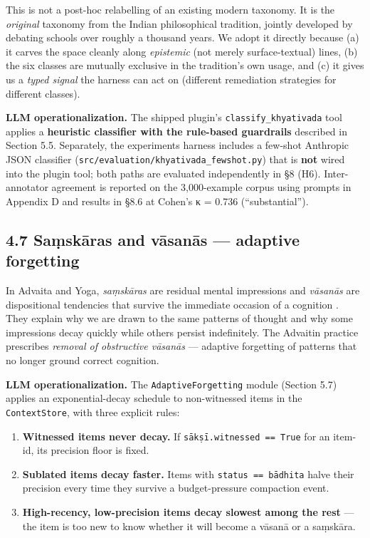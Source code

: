 This is not a post-hoc relabelling of an existing modern taxonomy. It is the \emph{original} taxonomy from the Indian philosophical tradition, jointly developed by debating schools over roughly a thousand years. We adopt it directly because (a) it carves the space cleanly along \emph{epistemic} (not merely surface-textual) lines, (b) the six classes are mutually exclusive in the tradition's own usage, and (c) it gives us a \emph{typed signal} the harness can act on (different remediation strategies for different classes).

\textbf{LLM operationalization.} The shipped plugin's \texttt{classify\_khyativada} tool applies a \textbf{heuristic classifier with the rule-based guardrails} described in Section 5.5. Separately, the experiments harness includes a few-shot Anthropic JSON classifier (\texttt{src/evaluation/khyativada\_fewshot.py}) that is \textbf{not} wired into the plugin tool; both paths are evaluated independently in §8 (H6). Inter-annotator agreement is reported on the 3,000-example corpus using prompts in Appendix D and results in §8.6 at Cohen's κ = 0.736 (``substantial'').

\subsection{4.7 Saṃskāras and vāsanās --- adaptive forgetting}\label{saux1e43skux101ras-and-vux101sanux101s-adaptive-forgetting}

In Advaita and Yoga, \emph{saṃskāras} are residual mental impressions and \emph{vāsanās} are dispositional tendencies that survive the immediate occasion of a cognition \citep{deutsch1969advaita, sankaraupadesha, halbfass1991traditioncomparison}. They explain why we are drawn to the same patterns of thought and why some impressions decay quickly while others persist indefinitely. The Advaitin practice prescribes \emph{removal of obstructive vāsanās} --- adaptive forgetting of patterns that no longer ground correct cognition.

\textbf{LLM operationalization.} The \texttt{AdaptiveForgetting} module (Section 5.7) applies an exponential-decay schedule to non-witnessed items in the \texttt{ContextStore}, with three explicit rules:

\begin{enumerate}
\def\labelenumi{\arabic{enumi}.}
\tightlist
\item
  \textbf{Witnessed items never decay.} If \texttt{sākṣī.witnessed\ ==\ True} for an item-id, its precision floor is fixed.
\item
  \textbf{Sublated items decay faster.} Items with \texttt{status\ ==\ bādhita} halve their precision every time they survive a budget-pressure compaction event.
\item
  \textbf{High-recency, low-precision items decay slowest among the rest} --- the item is too new to know whether it will become a vāsanā or a saṃskāra.
\end{enumerate}

